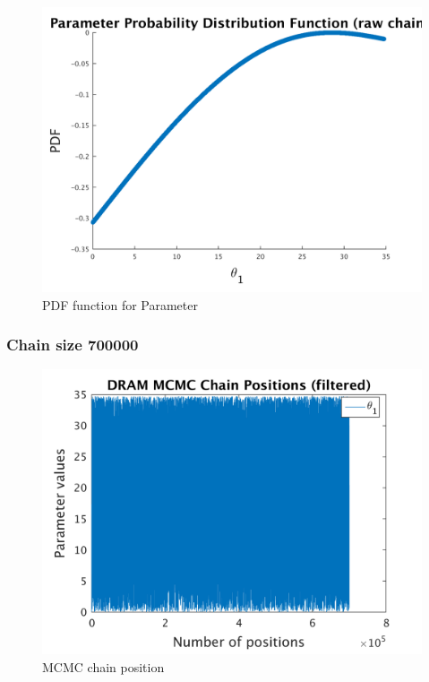 \begin{figure}[h!]
  
  \centering
   \includegraphics[scale=0.75]{output_300000/ip_logLike_unified}
   \caption{PDF function for Parameter }
\end{figure}


%
\subsubsection{Chain size 700000 }

\begin{figure}[h!]
  
  \centering
   \includegraphics[scale=0.75]{output_700000/simple_ip_chain_pos_filt}
   \caption{MCMC chain position }
\end{figure}


